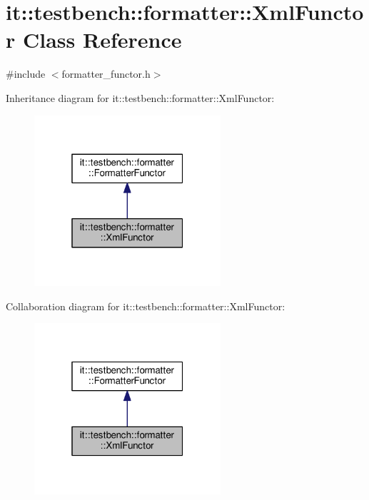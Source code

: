 \hypertarget{classit_1_1testbench_1_1formatter_1_1XmlFunctor}{\section{it\-:\-:testbench\-:\-:formatter\-:\-:Xml\-Functor Class Reference}
\label{d4/d4d/classit_1_1testbench_1_1formatter_1_1XmlFunctor}
}


{\ttfamily \#include $<$formatter\-\_\-functor.\-h$>$}



Inheritance diagram for it\-:\-:testbench\-:\-:formatter\-:\-:Xml\-Functor\-:
\nopagebreak
\begin{figure}[H]
\begin{center}
\leavevmode
\includegraphics[width=196pt]{d4/d13/classit_1_1testbench_1_1formatter_1_1XmlFunctor__inherit__graph}
\end{center}
\end{figure}


Collaboration diagram for it\-:\-:testbench\-:\-:formatter\-:\-:Xml\-Functor\-:
\nopagebreak
\begin{figure}[H]
\begin{center}
\leavevmode
\includegraphics[width=196pt]{d4/d1f/classit_1_1testbench_1_1formatter_1_1XmlFunctor__coll__graph}
\end{center}
\end{figure}
